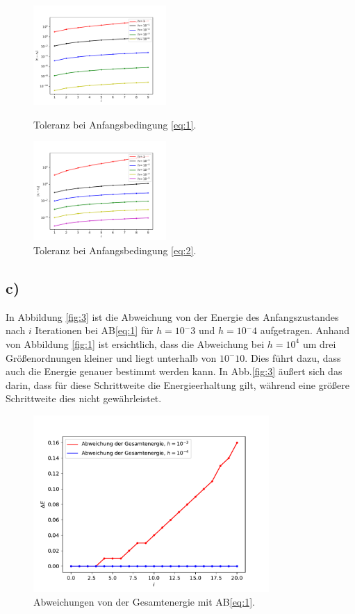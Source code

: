 \begin{figure}[h]
\centering
\includegraphics[width=0.45\textwidth]{A1/build/ab_plot.pdf}
\caption{Toleranz bei Anfangsbedingung \eqref{eq:1}.}
\label{fig:1}
\includegraphics[width=0.45\textwidth]{A1/build/ab_plot2.pdf}
\caption{Toleranz bei Anfangsbedingung \eqref{eq:2}.}
\label{fig:2}
\end{figure}

\FloatBarrier

\subsection*{c)}
In Abbildung \ref{fig:3} ist die Abweichung von der Energie des Anfangszustandes nach $i$ Iterationen bei AB\eqref{eq:1} für $h=10^-3$ und $h=10^-4$ aufgetragen.
Anhand von Abbildung \ref{fig:1} ist ersichtlich, dass die Abweichung bei $h=10^4$ um drei Größenordnungen kleiner und liegt unterhalb von $10^-10$. Dies führt dazu, dass auch die Energie genauer bestimmt werden kann. In Abb.\ref{fig:3} äußert sich das darin, dass für diese Schrittweite die Energieerhaltung gilt, während eine größere Schrittweite dies nicht gewährleistet.
\begin{figure}[h]
\includegraphics[width=0.8\textwidth]{A1/build/E.pdf}
\caption{Abweichungen von der Gesamtenergie mit AB\eqref{eq:1}.}
\end{figure}